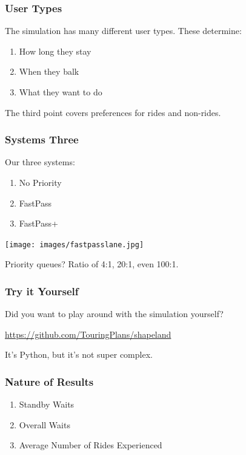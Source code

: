 \begin{frame}
\frametitle{User Types}

The simulation has many different user types. These determine:

\begin{enumerate}
	\item How long they stay
	\item When they balk
	\item What they want to do
\end{enumerate}

The third point covers preferences for rides and non-rides.


\end{frame}


\begin{frame}
\frametitle{Systems Three}

Our three systems:

\begin{enumerate}
	\item No Priority 
	\item FastPass
	\item FastPass+
\end{enumerate}

\begin{center}
	\texttt{[image: images/fastpasslane.jpg]}
\end{center}

Priority queues? Ratio of 4:1, 20:1, even 100:1.

\end{frame}


\begin{frame}
\frametitle{Try it Yourself}

Did you want to play around with the simulation yourself? 

\url{https://github.com/TouringPlans/shapeland}

It's Python, but it's not super complex.

\end{frame}

\begin{frame}
\frametitle{Nature of Results}

\begin{enumerate}
	\item Standby Waits
	\item Overall Waits
	\item Average Number of Rides Experienced
\end{enumerate}


\end{frame}


